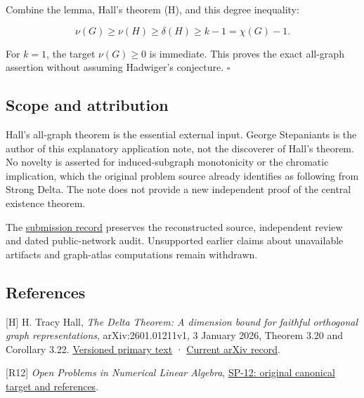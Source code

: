 \documentclass[10pt,a4paper]{article}
\begin{document}
Combine the lemma, Hall's theorem (H), and this degree inequality:

\[
\nu(G)\ge\nu(H)\ge\delta(H)\ge k-1=\chi(G)-1.
\]

For \(k=1\), the target \(\nu(G)\ge0\) is immediate. This proves the
exact all-graph assertion without assuming Hadwiger's conjecture.
\(\square\)

\subsection{Scope and attribution}\label{scope-and-attribution}

Hall's all-graph theorem is the essential external input. George
Stepaniants is the author of this explanatory application note, not the
discoverer of Hall's theorem. No novelty is asserted for
induced-subgraph monotonicity or the chromatic implication, which the
original problem source already identifies as following from Strong
Delta. The note does not provide a new independent proof of the central
existence theorem.

The
\href{https://github.com/ajt60gaibb/OpenProblemsInNLA/blob/main/references/stepaniants-sp11-sp12-2026-09-11/README.md}{submission
record} preserves the reconstructed source, independent review and dated
public-network audit. Unsupported earlier claims about unavailable
artifacts and graph-atlas computations remain withdrawn.

\subsection{References}\label{references}

{[}H{]} H. Tracy Hall, \emph{The Delta Theorem: A dimension bound for
faithful orthogonal graph representations}, arXiv:2601.01211v1, 3
January 2026, Theorem 3.20 and Corollary 3.22.
\href{https://arxiv.org/html/2601.01211v1}{Versioned primary text} ·
\href{https://arxiv.org/abs/2601.01211}{Current arXiv record}.

{[}R12{]} \emph{Open Problems in Numerical Linear Algebra},
\href{https://github.com/ajt60gaibb/OpenProblemsInNLA/blob/main/eigenvalues-and-inverse-problems/SP-12/README.md}{SP-12:
original canonical target and references}.
\end{document}
